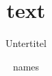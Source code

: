 \documentclass[ngerman,%
cd=true,%
cdgeometry=false,
fontsize=10pt,
]{tudscrreprt}
\providecommand{\graduation}[1]{}
\providecommand{\thesis}[1]{}
\begin{document}

\title{text}
\author{names}
\graduation{graduation}
\thesis{thesis}
\subtitle{Untertitel}


\makecover
\makecover[cdgeometry=false]

\maketitle[cdfont=false]


\blindtext
\end{document}
